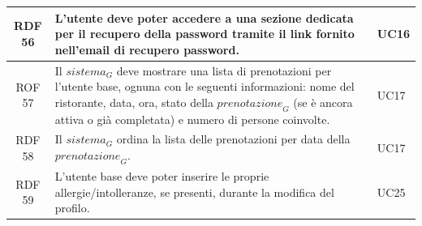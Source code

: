 \documentclass[12pt, oneside]{article}
\begin{document}
\begin{longtable}{|c|p{14cm}|p{2cm}|}
    \hline
    RDF 56 & L’utente deve poter accedere a una sezione dedicata per il recupero della password tramite il link fornito nell’email di recupero password.  & UC16 \\
    \hline
    ROF 57 & Il $\textit{sistema}_G$ deve mostrare una lista di prenotazioni per l'utente base, ognuna con le seguenti informazioni:
    nome del ristorante, data, ora, stato della $\textit{prenotazione}_G$ (se è ancora attiva o già completata) e numero di persone coinvolte. & UC17 \\
    \hline
    RDF 58 & Il $\textit{sistema}_G$ ordina la lista delle prenotazioni per data della $\textit{prenotazione}_G$.  & UC17 \\
    \hline

    RDF 59 & L'utente base deve poter inserire le proprie allergie/intolleranze, se presenti, durante la modifica del profilo.  & UC25  \\
    \hline


\end{longtable}
\end{document}
